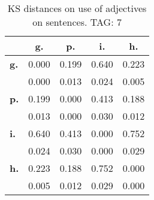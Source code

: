 \begin{table}[h!]
\begin{center}
\begin{tabular}{| l || c | c | c | c |}\hline
 & {\bf g.} & {\bf p.} & {\bf i.} & {\bf h.} \\\hline\hline
{\bf g.} & 0.000 & 0.199 & 0.640 & 0.223 \\
{\bf } & 0.000 & 0.013 & 0.024 & 0.005 \\\hline
{\bf p.} & 0.199 & 0.000 & 0.413 & 0.188 \\
{\bf } & 0.013 & 0.000 & 0.030 & 0.012 \\\hline
{\bf i.} & 0.640 & 0.413 & 0.000 & 0.752 \\
{\bf } & 0.024 & 0.030 & 0.000 & 0.029 \\\hline
{\bf h.} & 0.223 & 0.188 & 0.752 & 0.000 \\
{\bf } & 0.005 & 0.012 & 0.029 & 0.000 \\\hline
\end{tabular}
\caption{KS distances on use of adjectives on sentences. TAG: 7}
\end{center}
\end{table}